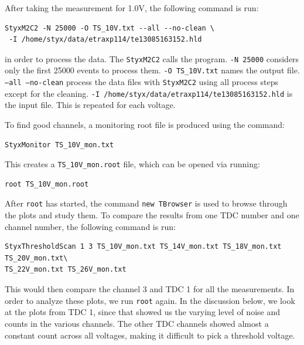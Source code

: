 \documentclass[a4paper]{report}
\numberwithin{equation}{section}
\begin{document}
After taking the measurement for 1.0V, the following command is run:

\begin{tcolorbox}
\begin{verbatim}
StyxM2C2 -N 25000 -O TS_10V.txt --all --no-clean \ 
 -I /home/styx/data/etraxp114/te13085163152.hld
\end{verbatim}
\end{tcolorbox}

\noindent in order to process the data. The \texttt{StyxM2C2} calls the program. \texttt{-N 25000} considers only the first 25000 events to process them. \texttt{-O TS\_10V.txt} names the output file. \texttt{--all --no-clean} process the data files with \texttt{StyxM2C2} using all process steps except for the cleaning. \texttt{-I \slash home\slash styx\slash data\slash etraxp114\slash te13085163152.hld} is the input file. This is repeated for each voltage. 

To find good channels, a monitoring root file is produced using the command: 

\begin{tcolorbox}
\begin{verbatim}
StyxMonitor TS_10V_mon.txt
\end{verbatim}
\end{tcolorbox}
\noindent This creates a \texttt{TS\_10V\_mon.root} file, which can be opened via running:

\begin{tcolorbox}
\begin{verbatim}
root TS_10V_mon.root
\end{verbatim}
\end{tcolorbox}
\noindent After \texttt{root} has started, the command \texttt{new TBrowser} is used to browse through the plots and study them. To compare the results from one TDC number and one channel number, the following command is run: 

\begin{tcolorbox}
\begin{verbatim}
StyxThresholdScan 1 3 TS_10V_mon.txt TS_14V_mon.txt TS_18V_mon.txt TS_20V_mon.txt\ 
TS_22V_mon.txt TS_26V_mon.txt
\end{verbatim}
\end{tcolorbox}
\noindent This would then compare the channel 3 and TDC 1 for all the measurements. In order to analyze these plots, we run \texttt{root} again. In the discussion below, we look at the plots from TDC 1, since that showed us the varying level of noise and counts in the various channels. The other TDC channels showed almost a constant count across all voltages, making it difficult to pick a threshold voltage. 
\end{document}

